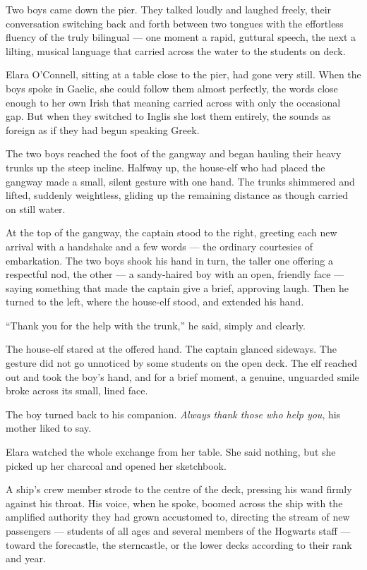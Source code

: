 Two boys came down the pier. They talked loudly and laughed freely, their conversation switching back and forth between two tongues with the effortless fluency of the truly bilingual --- one moment a rapid, guttural speech, the next a lilting, musical language that carried across the water to the students on deck.

Elara O'Connell, sitting at a table close to the pier, had gone very still. When the boys spoke in Gaelic, she could follow them almost perfectly, the words close enough to her own Irish that meaning carried across with only the occasional gap. But when they switched to Inglis she lost them entirely, the sounds as foreign as if they had begun speaking Greek.

The two boys reached the foot of the gangway and began hauling their heavy trunks up the steep incline. Halfway up, the house-elf who had placed the gangway made a small, silent gesture with one hand. The trunks shimmered and lifted, suddenly weightless, gliding up the remaining distance as though carried on still water.

At the top of the gangway, the captain stood to the right, greeting each new arrival with a handshake and a few words — the ordinary courtesies of embarkation. The two boys shook his hand in turn, the taller one offering a respectful nod, the other — a sandy-haired boy with an open, friendly face — saying something that made the captain give a brief, approving laugh. Then he turned to the left, where the house-elf stood, and extended his hand.

\enquote{Thank you for the help with the trunk,} he said, simply and clearly.

The house-elf stared at the offered hand. The captain glanced sideways. The gesture did not go unnoticed by some students on the open deck. The elf reached out and took the boy's hand, and for a brief moment, a genuine, unguarded smile broke across its small, lined face.

The boy turned back to his companion. \textit{Always thank those who help you}, his mother liked to say.

Elara watched the whole exchange from her table. She said nothing, but she picked up her charcoal and opened her sketchbook.

A ship's crew member strode to the centre of the deck, pressing his wand firmly against his throat. His voice, when he spoke, boomed across the ship with the amplified authority they had grown accustomed to, directing the stream of new passengers --- students of all ages and several members of the Hogwarts staff --- toward the forecastle, the sterncastle, or the lower decks according to their rank and year.

